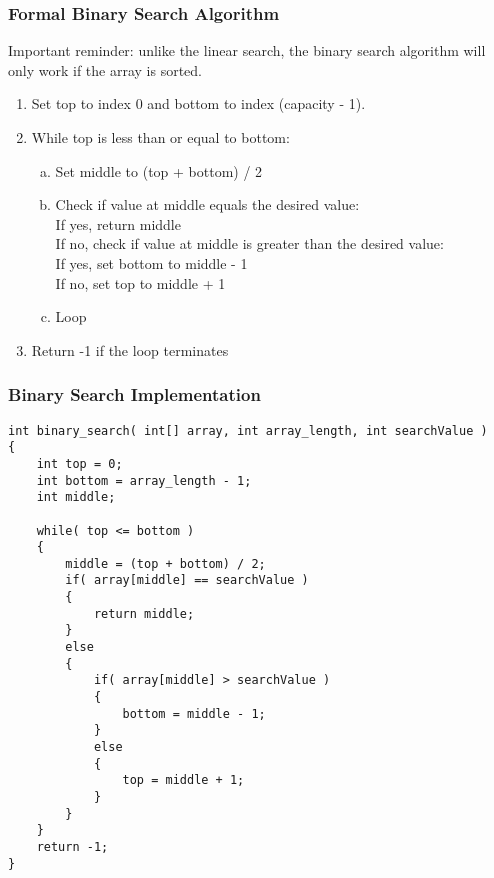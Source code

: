 \begin{frame}
\frametitle{Formal Binary Search Algorithm}

Important reminder: unlike the linear search, the binary search algorithm will only work if the array is sorted.

\begin{enumerate}
\item Set top to index 0 and bottom to index (capacity - 1).
\item While top is less than or equal to bottom:
	\begin{enumerate}[a)]
		\item Set middle to (top + bottom) / 2
		\item Check if value at middle equals the desired value:\\
			  \quad If yes, return middle\\
			  \quad If no, check if value at middle is greater than the desired value:\\
				\quad\quad If yes, set bottom to middle - 1\\
				\quad\quad If no, set top to middle + 1
		\item Loop
	\end{enumerate}
\item Return -1 if the loop terminates
\end{enumerate}

\end{frame}

\begin{frame}[fragile]
\frametitle{Binary Search Implementation}
{\tiny
\begin{verbatim}
int binary_search( int[] array, int array_length, int searchValue )
{
    int top = 0; 
    int bottom = array_length - 1;
    int middle;

    while( top <= bottom )
    {
        middle = (top + bottom) / 2;
        if( array[middle] == searchValue )
        {
            return middle;
        }
        else
        {
            if( array[middle] > searchValue )
            {
                bottom = middle - 1;
            }
            else
            {
                top = middle + 1;
            }
        }
    }
    return -1;
}
\end{verbatim}
}
\end{frame}


